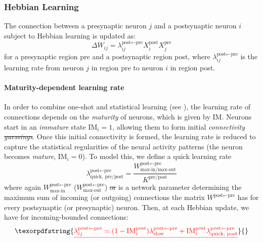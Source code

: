 \documentclass{article}
\providecommand{\DIFaddtex}[1]{{\protect\color{blue}\uwave{#1}}} %
\providecommand{\DIFdeltex}[1]{{\protect\color{red}\sout{#1}}}                      %
\providecommand{\DIFaddbegin}{} %
\providecommand{\DIFaddend}{} %
\providecommand{\DIFdelbegin}{} %
\providecommand{\DIFdelend}{} %
\providecommand{\DIFadd}[1]{\texorpdfstring{\DIFaddtex{#1}}{#1}} %
\providecommand{\DIFdel}[1]{\texorpdfstring{\DIFdeltex{#1}}{}} %
\begin{document}
\subsubsection*{Hebbian Learning}
The connection between a presynaptic neuron $j$ and a postsynaptic neuron $i$ subject to Hebbian learning is updated as:
\begin{equation}
            \Delta W_{ij} = \lambda_{ij}^{\textrm{post} \leftarrow \textrm{pre}}
            X_i^\textrm{post} X_j^\textrm{pre}
\end{equation}
for a presynaptic region pre and a postsynaptic region post, where $\lambda_{ij}^{\textrm{post} \leftarrow \textrm{pre}}$ is the learning rate from neuron $j$ in region pre to neuron $i$ in region post.
\paragraph*{Maturity-dependent learning rate}
In order to combine one-shot and statistical learning (see ), the learning rate of connections depends on the \textit{maturity} of neurons, which is given by $\textrm{IM}$. Neurons start in an \textit{immature} state $\textrm{IM}_i = 1$, allowing them to form initial \textit{connectivity \DIFdelbegin \DIFdel{guessings}\DIFdelend \DIFaddbegin \DIFadd{estimates}\DIFaddend }. Once this initial connectivity is formed, the learning rate is reduced to capture the statistical regularities of the neural activity patterns (the neuron becomes \textit{mature}, $\textrm{IM}_i = 0$). To model this, we define a quick learning rate
\begin{equation}
        \lambda^{\textrm{post}\leftarrow\textrm{pre}}_\textrm{quick, pre/post} = \frac{W^{\textrm{post}\leftarrow\textrm{pre}}_\textrm{max-in/max-out}}{K^\textrm{pre/post}} 
        \label{eq:quick_lambda}
\end{equation}
where again $W^{\textrm{post}\leftarrow\textrm{pre}}_\textrm{max-in}$ (\DIFaddbegin \DIFadd{or }\DIFaddend $W^{\textrm{post}\leftarrow\textrm{pre}}_\textrm{max-out}$) \DIFdelbegin \DIFdel{or }\DIFdelend is a network parameter determining the maximum sum of incoming (or outgoing) connections the matrix $W^{\textrm{post}\leftarrow\textrm{pre}}$ has for every postsynaptic (or presynaptic) neuron. Then, at each Hebbian update, we have for incoming-bounded connections:
\DIFdelbegin \begin{displaymath}
    \DIFdel{\lambda_{ij}^{\textrm{post} \leftarrow \textrm{pre}} = (1 - \textrm{IM}^\textrm{post}_i)\lambda^{\textrm{post} \leftarrow \textrm{pre}}_\textrm{slow} + \textrm{IM}^\textrm{post}_i\lambda^{\textrm{post}\leftarrow\textrm{pre}}_\textrm{quick, post}
}\end{displaymath}%
\end{document}
